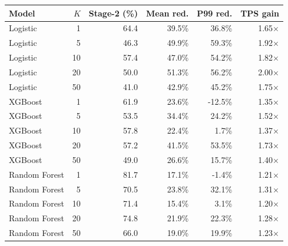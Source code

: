 \begin{tabular*}{\linewidth}{@{\extracolsep{\fill}}l r r r r r@{}}
\toprule
Model & $K$ & Stage-2 (\%) & Mean red. & P99 red. & TPS gain \\
\midrule
Logistic & 1 & 64.4 & 39.5\% & 36.8\% & 1.65$\times$ \\
Logistic & 5 & 46.3 & 49.9\% & 59.3\% & 1.92$\times$ \\
Logistic & 10 & 57.4 & 47.0\% & 54.2\% & 1.82$\times$ \\
Logistic & 20 & 50.0 & 51.3\% & 56.2\% & 2.00$\times$ \\
Logistic & 50 & 41.0 & 42.9\% & 45.2\% & 1.75$\times$ \\
XGBoost & 1 & 61.9 & 23.6\% & -12.5\% & 1.35$\times$ \\
XGBoost & 5 & 53.5 & 34.4\% & 24.2\% & 1.52$\times$ \\
XGBoost & 10 & 57.8 & 22.4\% & 1.7\% & 1.37$\times$ \\
XGBoost & 20 & 57.2 & 41.5\% & 53.5\% & 1.73$\times$ \\
XGBoost & 50 & 49.0 & 26.6\% & 15.7\% & 1.40$\times$ \\
Random Forest & 1 & 81.7 & 17.1\% & -1.4\% & 1.21$\times$ \\
Random Forest & 5 & 70.5 & 23.8\% & 32.1\% & 1.31$\times$ \\
Random Forest & 10 & 71.4 & 15.4\% & 3.1\% & 1.20$\times$ \\
Random Forest & 20 & 74.8 & 21.9\% & 22.3\% & 1.28$\times$ \\
Random Forest & 50 & 66.0 & 19.0\% & 19.9\% & 1.23$\times$ \\
\bottomrule
\end{tabular*}
